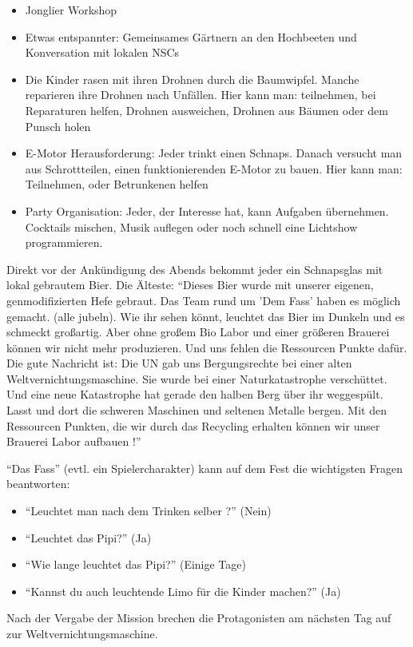 \begin{itemize}
\item Jonglier Workshop
\item Etwas entspannter: Gemeinsames Gärtnern an den Hochbeeten und Konversation mit lokalen NSCs
\item Die Kinder rasen mit ihren Drohnen durch die Baumwipfel. Manche reparieren ihre Drohnen nach Unfällen. Hier kann man: teilnehmen, bei Reparaturen helfen, Drohnen ausweichen, Drohnen aus Bäumen oder dem Punsch holen
\item E-Motor Herausforderung: Jeder trinkt einen Schnaps. Danach versucht man aus Schrottteilen, einen funktionierenden E-Motor zu bauen. Hier kann man: Teilnehmen, oder Betrunkenen helfen
\item Party Organisation: Jeder, der Interesse hat, kann Aufgaben übernehmen. Cocktails mischen, Musik auflegen oder noch schnell eine Lichtshow programmieren.
\end{itemize}

Direkt vor der Ankündigung des Abends bekommt jeder ein Schnapsglas mit lokal gebrautem Bier. Die Älteste: \enquote{Dieses Bier wurde mit unserer eigenen, genmodifizierten Hefe gebraut. Das Team rund um 'Dem Fass' haben es möglich gemacht. (alle jubeln). Wie ihr sehen könnt, leuchtet das Bier im Dunkeln und es schmeckt großartig. Aber ohne großem Bio Labor und einer größeren Brauerei können wir nicht mehr produzieren. Und uns fehlen die Ressourcen Punkte dafür. Die gute Nachricht ist: Die UN gab uns Bergungsrechte bei einer alten Weltvernichtungsmaschine. Sie wurde bei einer Naturkatastrophe verschüttet. Und eine neue Katastrophe hat gerade den halben Berg über ihr weggespült. Lasst und dort die schweren Maschinen und seltenen Metalle bergen. Mit den Ressourcen Punkten, die wir durch das Recycling erhalten können wir unser Brauerei Labor aufbauen !}

\enquote{Das Fass} (evtl. ein Spielercharakter) kann auf dem Fest die wichtigsten Fragen beantworten:
\begin{itemize}
\item \enquote{Leuchtet man nach dem Trinken selber ?} (Nein)
\item \enquote{Leuchtet das Pipi?} (Ja)
\item \enquote{Wie lange leuchtet das Pipi?} (Einige Tage)
\item \enquote{Kannst du auch leuchtende Limo für die Kinder machen?} (Ja)
\end{itemize}

Nach der Vergabe der Mission brechen die Protagonisten am nächsten Tag auf zur Weltvernichtungsmaschine.

